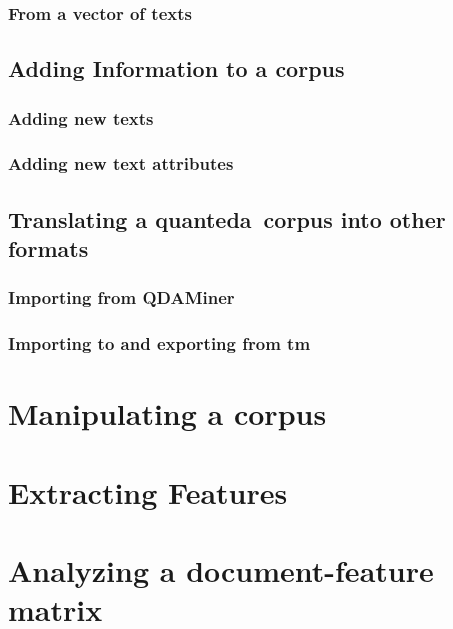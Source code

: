 \documentclass[11pt]{article}\usepackage[]{graphicx}\usepackage[]{color}
\newcommand{\quanteda}{\textsf{quanteda}\ }
\begin{document}
\subsubsection{From a vector of texts}


\subsection{Adding Information to a corpus}

\subsubsection{Adding new texts}

\subsubsection{Adding new text attributes}


\subsection{Translating a \quanteda corpus into other formats}

\subsubsection{Importing from QDAMiner}

\subsubsection{Importing to and exporting from \textsf{tm}}


\section{Manipulating a corpus}


\section{Extracting Features}


\section{Analyzing a document-feature matrix}







\end{document}

